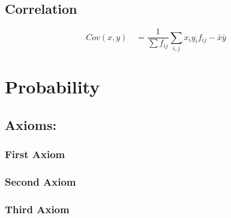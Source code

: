 \documentclass[12pt]{article}
\begin{document}
\subsection{Correlation}
\[Cov(x,y) \quad = \frac{1}{\sum f_{ij}} \sum_{i,j} x_i y_i f_{ij} -\bar{x}\bar{y}\]
\section{Probability}
\subsection{Axioms:}
\subsubsection{First Axiom}
\subsubsection{Second Axiom}
\subsubsection{Third Axiom}
\end{document}
